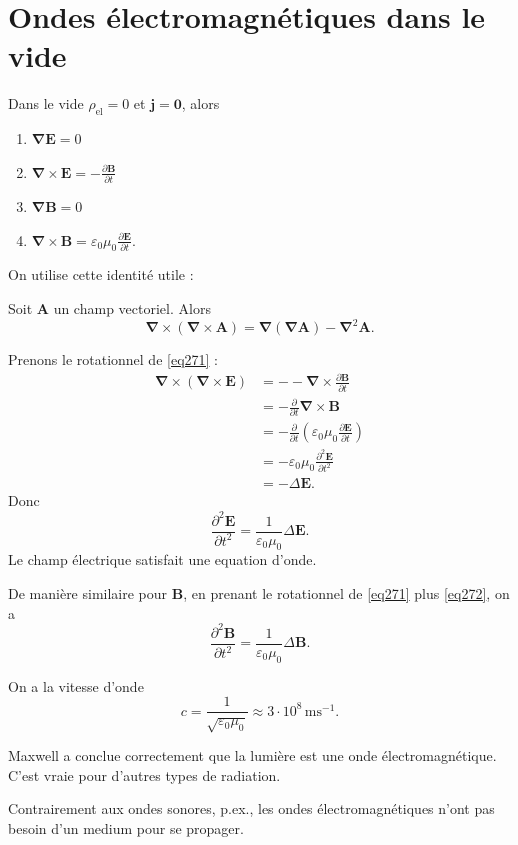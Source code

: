 \section{Ondes électromagnétiques dans le vide}

Dans le vide $\rho _{\mathrm{el}}=0$ et $\boldsymbol{j}=\boldsymbol{0}$, alors 
\begin{enumerate}
\item $\boldsymbol{\nabla E}=0$
\item \label{eq271} $\boldsymbol{\nabla}\times \boldsymbol{E}=-\frac{ \partial \boldsymbol{B} }{ \partial t}$
\item $\boldsymbol{\nabla B}=0$
\item \label{eq272} $\boldsymbol{\nabla}\times \boldsymbol{B}=\varepsilon_{0}\mu_{0}\frac{ \partial \boldsymbol{E} }{ \partial t }$.
\end{enumerate}
On utilise cette identité utile : 
\begin{proposition}
Soit $\boldsymbol{A}$ un champ vectoriel. Alors
$$
\boldsymbol{\nabla}\times (\boldsymbol{\nabla}\times \boldsymbol{A})=\boldsymbol{\nabla}(\boldsymbol{\nabla A})-\boldsymbol{\nabla}^{2}\boldsymbol{A}.
$$
\end{proposition}

Prenons le rotationnel de \ref{eq271} :
\begin{align*}
\boldsymbol{\nabla}\times(\boldsymbol{\nabla}\times \boldsymbol{E}) & =- -\boldsymbol{\nabla}\times \frac{ \partial \boldsymbol{B} }{ \partial t }  \\
 & =-\frac{ \partial  }{ \partial t } \boldsymbol{\nabla}\times \boldsymbol{B} \\
 & =-\frac{ \partial  }{ \partial t } \left( \varepsilon_{0}\mu_{0}\frac{ \partial \boldsymbol{E} }{ \partial t}  \right) \\
 & =-\varepsilon_{0}\mu_{0}\frac{ \partial^{2}\boldsymbol{E} }{ \partial t^{2} }  \\
 & =-\Delta \boldsymbol{E}.
\end{align*}
Donc
$$
\frac{ \partial^{2}\boldsymbol{E} }{ \partial t^{2} }=\frac{1}{\varepsilon_{0}\mu_{0}}\Delta \boldsymbol{E}. 
$$
Le champ électrique satisfait une equation d'onde.

De manière similaire pour $\boldsymbol{B}$, en prenant le rotationnel de \ref{eq271} plus \ref{eq272}, on a
$$
\frac{ \partial^{2}\boldsymbol{B} }{ \partial t^{2} } =\frac{1}{\varepsilon_{0}\mu_{0}}\Delta \boldsymbol{B}.
$$

On a la vitesse d'onde 
$$
c=\frac{1}{\sqrt{ \varepsilon_{0}\mu_{0} }}\approx 3\cdot 10^{8}\,\mathrm{ms}^{-1}.
$$
\begin{remark}
Maxwell a conclue correctement que la lumière est une onde électromagnétique. C'est vraie pour d'autres types de radiation. 
\end{remark}
\begin{remark}
Contrairement aux ondes sonores, p.ex., les ondes électromagnétiques n'ont pas besoin d'un medium pour se propager.
\end{remark}
